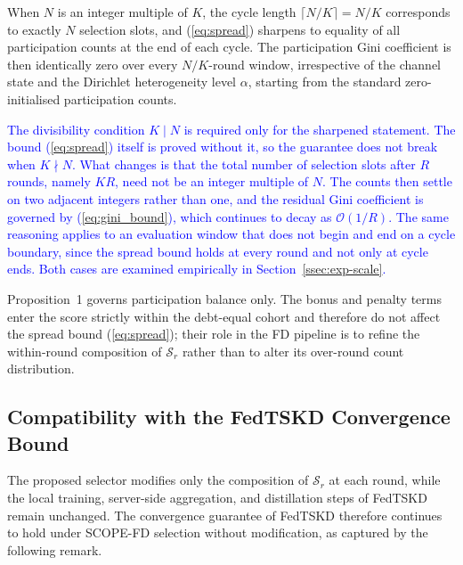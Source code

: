 \documentclass[journal]{IEEEtran}
\newcommand{\rev}[1]{\textcolor{blue}{#1}}
\begin{document}
When $N$ is an integer multiple of $K$, the cycle length $\lceil N/K \rceil = N/K$ corresponds to exactly $N$ selection slots, and (\ref{eq:spread}) sharpens to equality of all participation counts at the end of each cycle. The participation Gini coefficient is then identically zero over every $N/K$-round window, irrespective of the channel state and the Dirichlet heterogeneity level $\alpha$, starting from the standard zero-initialised participation counts.

\rev{The divisibility condition $K \mid N$ is required only for the sharpened statement. The bound (\ref{eq:spread}) itself is proved without it, so the guarantee does not break when $K \nmid N$. What changes is that the total number of selection slots after $R$ rounds, namely $KR$, need not be an integer multiple of $N$. The counts then settle on two adjacent integers rather than one, and the residual Gini coefficient is governed by (\ref{eq:gini_bound}), which continues to decay as $\mathcal{O}(1/R)$. The same reasoning applies to an evaluation window that does not begin and end on a cycle boundary, since the spread bound holds at every round and not only at cycle ends. Both cases are examined empirically in Section~\ref{ssec:exp-scale}.}

Proposition~1 governs participation balance only. The bonus and penalty terms enter the score strictly within the debt-equal cohort and therefore do not affect the spread bound (\ref{eq:spread}); their role in the FD pipeline is to refine the within-round composition of $\mathcal{S}_r$ rather than to alter its over-round count distribution. %

\subsection{Compatibility with the FedTSKD Convergence Bound}
\label{ssec:convergence-compat}

The proposed selector modifies only the composition of $\mathcal{S}_r$ at each round, while the local training, server-side aggregation, and distillation steps of FedTSKD \cite{mu2024fedtskd} remain unchanged. The convergence guarantee of FedTSKD therefore continues to hold under SCOPE-FD selection without modification, as captured by the following remark.
\end{document}
